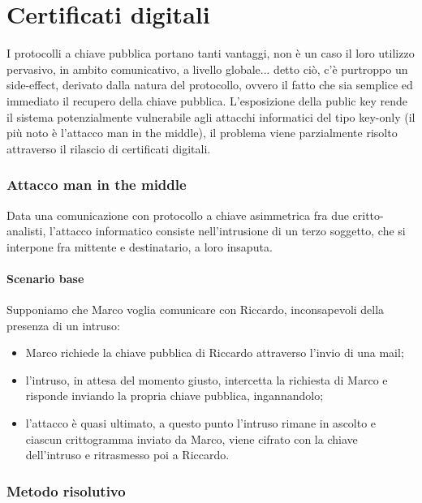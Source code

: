 \chapter{Certificati digitali}

I protocolli a chiave pubblica portano tanti vantaggi, non è un caso il loro utilizzo pervasivo, in ambito comunicativo, a livello globale... detto ciò, c'è purtroppo un side-effect, derivato dalla natura del protocollo, ovvero il fatto che sia semplice ed immediato il recupero della chiave pubblica. L'esposizione della public key rende il sistema potenzialmente vulnerabile agli attacchi informatici del tipo key-only (il più noto è l'attacco man in the middle), il problema viene parzialmente risolto attraverso il rilascio di certificati digitali.

\subsection{Attacco man in the middle}

Data una comunicazione con protocollo a chiave asimmetrica fra due critto-analisti, l'attacco informatico consiste nell'intrusione di un terzo soggetto, che si interpone fra mittente e destinatario, a loro insaputa. 

\subsubsection{Scenario base}

Supponiamo che Marco voglia comunicare con Riccardo, inconsapevoli della presenza di un intruso:

\begin{itemize}
	\item Marco richiede la chiave pubblica di Riccardo attraverso l'invio di una mail;
	\item l'intruso, in attesa del momento giusto, intercetta la richiesta di Marco e risponde inviando la propria chiave pubblica, ingannandolo;
	\item l'attacco è quasi ultimato, a questo punto l'intruso rimane in ascolto e ciascun crittogramma inviato da Marco, viene cifrato con la chiave dell'intruso e ritrasmesso poi a Riccardo.
\end{itemize}

\subsection{Metodo risolutivo}


